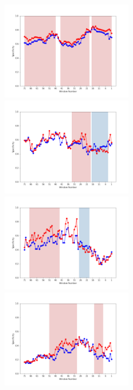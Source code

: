 \documentclass[submit]{ipsj}
\begin{document}
\begin{figure}[t]
\begin{minipage}{\textwidth}
\vspace{0.08\textheight}
\begin{center}
    \includegraphics[width=0.495\textwidth]{Uenaka_fig/RQ2_result/Nova/Nova_review_Specificity.pdf}
    \includegraphics[width=0.495\textwidth]{Uenaka_fig/RQ2_result/Neutron/Neutron_review_Specificity.pdf}
    \includegraphics[width=0.495\textwidth]{Uenaka_fig/RQ2_result/Cinder/Cinder_review_Specificity.pdf}
    \includegraphics[width=0.495\textwidth]{Uenaka_fig/RQ2_result/Keystone/Keystone_review_Specificity.pdf}

\end{center}
\end{minipage}
\end{figure}
\end{document}
